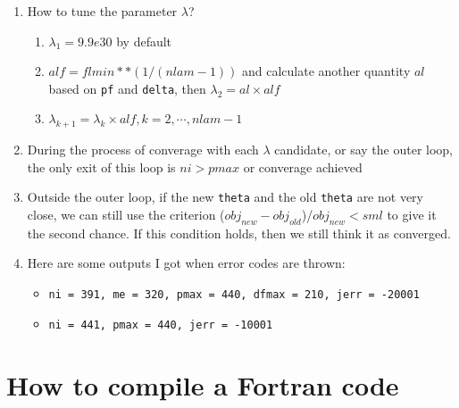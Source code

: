 \documentclass[12pt]{article}
\begin{document}
\begin{enumerate}[label={(\arabic*)}]
\item How to tune the parameter $\lambda$?
	\begin{enumerate}
		\item $\lambda_1 = 9.9e30$ by default
		\item $alf = flmin**(1/(nlam-1))$ and calculate another quantity $al$ based on \verb|pf| and 
		\verb|delta|, then $\lambda_2 = al\times alf$
		\item $\lambda_{k+1} = \lambda_k \times alf, k=2,\cdots, nlam-1$
	\end{enumerate}

\item During the process of converage with each $\lambda$ candidate, or say the outer loop, the only exit of this loop is $ni > pmax$ or converage achieved

\item Outside the outer loop, if the new \verb|theta| and the old \verb|theta| are not very close, we can still use the criterion ($obj_{new} - obj_{old}$)/$obj_{new} < sml$ to give it the second chance. If this condition holds, then we still think it as converged.

\item Here are some outputs I got when error codes are thrown:
\begin{itemize}
	\item \verb|ni = 391, me = 320, pmax = 440, dfmax = 210, jerr = -20001|
	\item \verb|ni = 441, pmax = 440, jerr = -10001|
\end{itemize}

\end{enumerate}

\section{How to compile a Fortran code}
\end{document}
